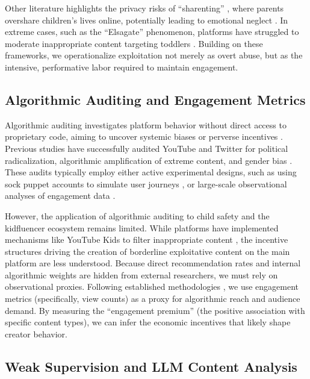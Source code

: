 \documentclass[letterpaper]{article} %
\begin{document}
Other literature highlights the privacy risks of ``sharenting'' \citep{steinberg2017sharenting,kopecky2020sharenting}, where parents overshare children's lives online, potentially leading to emotional neglect \citep{keskin2023sharenting}. In extreme cases, such as the ``Elsagate'' phenomenon, platforms have struggled to moderate inappropriate content targeting toddlers \citep{papadamou2020disturbed,bridle2017something,tahir2019bringing}. Building on these frameworks, we operationalize exploitation not merely as overt abuse, but as the intensive, performative labor required to maintain engagement.

\subsection{Algorithmic Auditing and Engagement Metrics}

Algorithmic auditing investigates platform behavior without direct access to proprietary code, aiming to uncover systemic biases or perverse incentives \citep{sandvig2014auditing,metaxa2021auditing}. Previous studies have successfully audited YouTube and Twitter for political radicalization, algorithmic amplification of extreme content, and gender bias \citep{ribeiro2020auditing,huszar2022algorithmic,haroon2023auditing,hussein2020measuring}. These audits typically employ either active experimental designs, such as using sock puppet accounts to simulate user journeys \citep{habib2025auditing}, or large-scale observational analyses of engagement data \citep{bouchaud2024auditing}. 

However, the application of algorithmic auditing to child safety and the kidfluencer ecosystem remains limited. While platforms have implemented mechanisms like YouTube Kids to filter inappropriate content \citep{papadamou2020disturbed}, the incentive structures driving the creation of borderline exploitative content on the main platform are less understood. Because direct recommendation rates and internal algorithmic weights are hidden from external researchers, we must rely on observational proxies. Following established methodologies \citep{covington2016deep,zhou2010impact,rieder2018ranking}, we use engagement metrics (specifically, view counts) as a proxy for algorithmic reach and audience demand. By measuring the ``engagement premium'' (the positive association with specific content types), we can infer the economic incentives that likely shape creator behavior.

\subsection{Weak Supervision and LLM Content Analysis}
\end{document}
